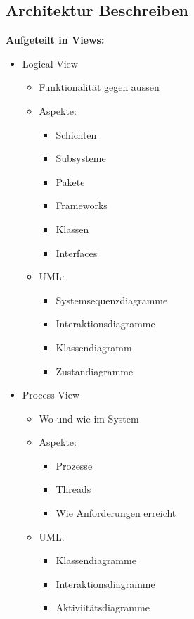 \documentclass[../ZF_SWEN1.tex]{subfiles}
\begin{document}
\subsection{Architektur Beschreiben}

\textbf{Aufgeteilt in Views: \\}

\begin{itemize}
		\item Logical View
		\begin{itemize}
			\item Funktionalität gegen aussen
			\item Aspekte: 
			\begin{itemize}
				\item Schichten
				\item Subsysteme
				\item Pakete
				\item Frameworks
				\item Klassen
				\item Interfaces
			\end{itemize}
			\item \colorbox{yellow!30}{UML:}
			\begin{itemize}
				\item Systemsequenzdiagramme
				\item Interaktionsdiagramme
				\item Klassendiagramm
				\item Zustandiagramme
			\end{itemize}
		\end{itemize}
\end{itemize}

\begin{itemize}
	\item Process View
	\begin{itemize}
			\item Wo und wie im System
			\item Aspekte: 
			\begin{itemize}
				\item Prozesse
				\item Threads
				\item Wie Anforderungen erreicht
			\end{itemize}
			\item \colorbox{yellow!30}{UML:}
			\begin{itemize}
				\item Klassendiagramme
				\item Interaktionsdiagramme
				\item Aktiviitätsdiagramme
				\end{itemize}
		\end{itemize}
	
\end{itemize}
\end{document}

